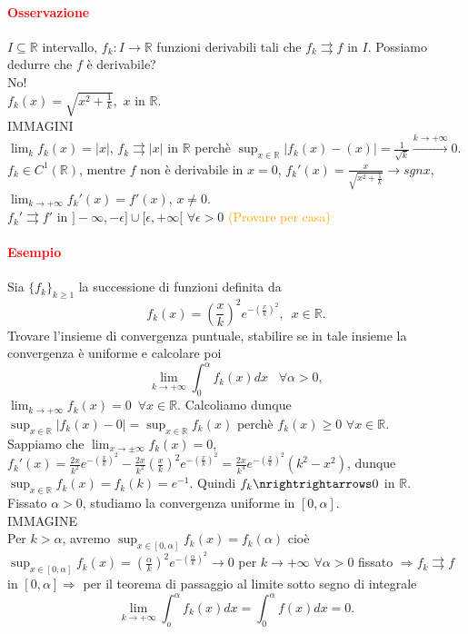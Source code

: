 \documentclass{article}
\newcommand{\R}{\mathbb{R}}
\begin{document}
\paragraph{\textcolor{red}{Osservazione}}
$I \subseteq \R$ intervallo, $f_k: I \rightarrow \R$ funzioni derivabili tali che $f_k \rightrightarrows f$ in $I$. Possiamo dedurre che $f$ è derivabile?\\
No!\\
$f_k(x)= \sqrt{x^2+\frac{1}{k}}, \,\, x$ in $\R$.\\
IMMAGINI\\
$\lim_{k}f_k(x)=|x|$, $f_k \rightrightarrows |x|$ in $\R$ perchè $\sup_{x\in \R}|f_k(x)-(x)|= \frac{1}{\sqrt{k}}\xrightarrow{k \rightarrow +\infty}0$. $f_k \in C^1(\R)$, mentre $f$ non è derivabile in $x =0$, $f_k' (x) = \frac{x}{\sqrt{x^2+\frac{1}{k}}}\rightarrow sgnx$, 
$\lim_{k \rightarrow+\infty}f_k'(x)=f'(x)$, $x \neq 0$.\\
$f_k' \rightrightarrows f'$ in $]-\infty,-\epsilon]\cup[\epsilon,+\infty[\,\, \forall \epsilon >0$ \textcolor{orange}{(Provare per casa)}

\paragraph{\textcolor{red}{Esempio}}
Sia $\{f_k\}_{k \geq 1}$ la successione di funzioni definita da 
\begin{equation*}
    f_k(x)=\left(\frac{x}{k} \right)^2 e^{-\left(\frac{x}{k}\right)^2}, \,\,\, x \in \R.
\end{equation*}
Trovare l'insieme di convergenza puntuale, stabilire se in tale insieme la convergenza è uniforme e calcolare poi 
\begin{equation*}
    \lim_{k \rightarrow +\infty} \int_{0}^{\alpha}f_k(x)dx\,\,\,\,\, \forall \alpha >0,
\end{equation*}
$\lim_{k \rightarrow +\infty} f_k(x)=0 \,\,\, \forall x \in \R$. Calcoliamo dunque $\sup_{x \in \R}|f_k(x)-0|=\sup_{x \in \R}f_k(x)$ perchè $f_k(x) \geq 0\,\, \forall x \in \R$.\\
Sappiamo che $\lim_{x \rightarrow \pm \infty}f_k(x)=0$, $ f_k'(x) = \frac{2x}{k^2}e^{-\left(\frac{x}{k}\right)^2}-\frac{2x}{k^2}\left(\frac{x}{k}\right)^2 e^{-\left(\frac{x}{k}\right)^2}= \frac{2x}{k^4}e^{-\left(\frac{x}{k}\right)^2}(k^2-x^2)$, dunque $\sup_{x \in \R}f_k(x) = f_k(k)= e^{-1}$. Quindi $f_k \nrightrightarrows 0$ in $\R$.\\
Fissato $\alpha >0$, studiamo la convergenza uniforme in $[0, \alpha]$.\\
IMMAGINE\\
Per $k > \alpha$, avremo $\sup_{x \in [0,\alpha]}f_k(x)=f_k(\alpha)$ cioè $\sup_{x \in [0, \alpha]} f_k(x) = \left( \frac{\alpha}{k} \right)^2 e^{-\left(\frac{\alpha}{k}\right)^2}\rightarrow 0$ per $k \rightarrow +\infty \,\, \forall \alpha >0$ fissato $\Rightarrow f_k \rightrightarrows f$ in $[0,\alpha] \Rightarrow$ per il teorema di passaggio al limite sotto segno di integrale\\
\begin{equation*}
    \lim_{k \rightarrow+\infty}\int_{o}^{\alpha} f_k(x) dx = \int_{0}^{\alpha}f(x) dx=0.
\end{equation*}
\end{document}
